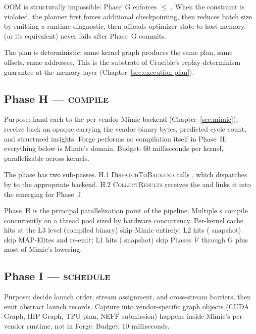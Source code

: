 OOM is structurally impossible: Phase~G enforces  $\le$ .
When the constraint is violated, the planner first forces additional checkpointing, then reduces batch size by emitting a runtime diagnostic, then offloads optimizer state to host memory.
 (or its equivalent) never fails after Phase~G commits.

The plan is deterministic: same kernel graph produces the same plan, same offsets, same addresses.
This is the substrate of Crucible's replay-determinism guarantee at the memory layer (Chapter~\ref{sec:execution-plan}).

\subsection{Phase H --- \textsc{compile}}
\label{sec:forge-phase-h}

Purpose: hand each   to the per-vendor Mimic backend (Chapter~\ref{sec:mimic}), receive back an opaque  carrying the vendor binary bytes, predicted cycle count, and structured insights.
Forge performs no compilation itself in Phase~H; everything below  is Mimic's domain.
Budget: 60 milliseconds per kernel, parallelizable across kernels.

The phase has two sub-passes.
H.1 \textsc{DispatchToBackend} calls , which dispatches by  to the appropriate backend.
H.2 \textsc{CollectResults} receives the  and links it into the emerging  for Phase~J.

Phase~H is the principal parallelization point of the pipeline.
Multiple s compile concurrently on a thread pool sized by hardware concurrency.
Per-kernel cache hits at the L3 level (compiled binary) skip Mimic entirely; L2 hits ( snapshot) skip MAP-Elites and re-emit; L1 hits ( snapshot) skip Phases~F through G plus most of Mimic's lowering.

\subsection{Phase I --- \textsc{schedule}}
\label{sec:forge-phase-i}

Purpose: decide launch order, stream assignment, and cross-stream barriers, then emit abstract launch records.
Capture into vendor-specific graph objects (CUDA Graph, HIP Graph, TPU plan, NEFF submission) happens inside Mimic's per-vendor runtime, not in Forge.
Budget: 10 milliseconds.

